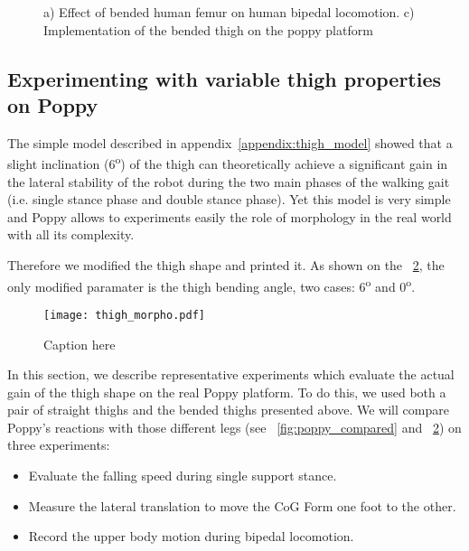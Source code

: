\begin{figure}[tb]
\centering
    \hfil
    \caption{ a) Effect of bended human femur on human bipedal locomotion.
    c) Implementation of the bended thigh on the poppy platform}
    \label{fig:poppy_thigh}
\end{figure}

\subsection{Experimenting with variable thigh properties on Poppy} %

The simple model described in appendix~\ref{appendix:thigh_model} showed that a slight inclination (6\textsuperscript{o}) of the thigh can theoretically achieve a significant gain in the lateral stability of the robot during the two main phases of the walking gait (i.e. single stance phase and double stance phase).
Yet this model is very simple and Poppy allows to experiments easily the role of morphology in the real world with all its complexity.

Therefore we modified the thigh shape and printed it. As shown on the \figurename~\ref{fig:thigh_drawings}, the only modified paramater is the thigh bending angle, two cases: 6\textsuperscript{o} and 0\textsuperscript{o}.

\begin{figure}[p]
    \begin{center}
        \texttt{[image: thigh\_morpho.pdf]}
    \end{center}
    \caption{Caption here}
    \label{fig:thigh_drawings}
\end{figure}

In this section, we describe representative experiments which evaluate the actual gain of the thigh shape on the real Poppy platform. To do this, we used both a pair of straight thighs and the bended thighs presented above. We will compare Poppy's reactions with those different legs (see \figurename~\ref{fig:poppy_compared} and \figurename~\ref{fig:thigh_drawings}) on three experiments:
\begin{itemize}
    \item Evaluate the falling speed during single support stance.
    \item Measure the lateral translation to move the CoG Form one foot to the other.
    \item Record the upper body motion during bipedal locomotion.
\end{itemize}

